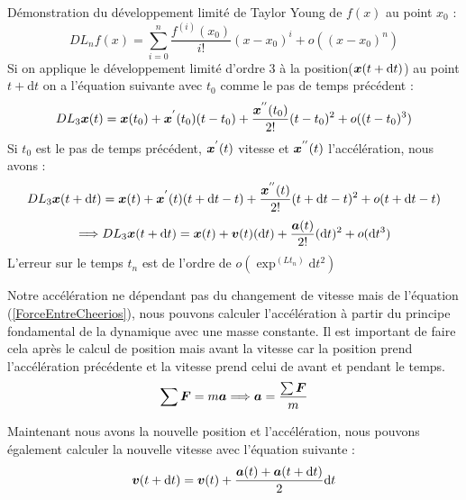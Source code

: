 \documentclass[a4paper, 11pt, oneside]{article} %
\newcommand{\dd}[1]{\mathrm{d}#1}
\begin{document}
        Démonstration du développement limité de Taylor Young de $f(x)$ au point $x_0$\cite{agarwal_introduction_2011} :
        \begin{equation}
            DL_n f(x) = \sum_{i=0}^{n}\frac{f^{(i)}(x_0)}{i!}(x-x_0)^i+ o((x-x_0)^n)
        \end{equation}
        Si on applique le développement limité d'ordre 3 à la position($\vb*{x}(t+\dd t)$) au point $t+\dd t$ on a l'équation suivante avec $t_0$ comme le pas de temps précédent :
        \[DL_3 \vb*{x}(t) = \vb*{x}(t_0)+\vb*{x}^{'}(t_0)(t-t_0)+\frac{\vb*{x}^{''}(t_0)}{2!}(t-t_0)^2 +o((t-t_0)^3)\]
        Si $t_0$ est le pas de temps précédent, $\vb*{x}^{'}(t)$ vitesse et $\vb*{x}^{''}(t)$ l'accélération, nous avons :
            \[DL_3 \vb*{x}(t+\dd t) = \vb*{x}(t)+\vb*{x}^{'}(t)(t+\dd t-t)+\frac{\vb*{x}^{''}(t)}{2!}(t+\dd t-t)^2+o(t+\dd t-t)\]
            \[\Longrightarrow DL_3 \vb*{x}(t+\dd t)= \vb*{x}(t)+\vb*{v}(t)(\dd t)+\frac{\vb*{a}(t)}{2!}(\dd t)^2+o(\dd t^3)\]
        L'erreur sur le temps $t_n$ est de l'ordre de $o(\exp^(Lt_n)\dd t^2)$ %

        Notre accélération ne dépendant pas du changement de vitesse mais de l'équation (\ref{ForceEntreCheerios}), nous pouvons calculer l'accélération à partir du principe fondamental de la dynamique avec une masse constante. Il est important de faire cela après le calcul de position mais avant la vitesse car la position prend l'accélération précédente et la vitesse prend celui de avant et pendant le temps.
        \begin{equation}
            \label{PFD}
            \sum  \vb*{F} = m\vb*{a} \Longrightarrow \vb*{a} = \frac{\sum \vb*{F}}{m}
        \end{equation}

        Maintenant nous avons la nouvelle position et l'accélération, nous pouvons également calculer la nouvelle vitesse avec l'équation suivante :
        \begin{equation}
            \label{verletVitesse}
            \vb*{v}(t+\dd t) = \vb*{v}(t)+\frac{\vb*{a}(t)+\vb*{a}(t+\dd t)}{2}\dd t 
        \end{equation}
\end{document}

